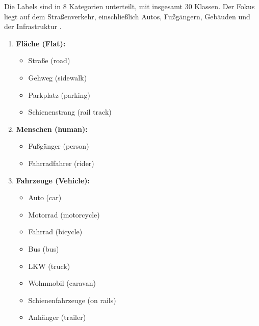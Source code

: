             Die Labels sind in $8$ Kategorien unterteilt, mit insgesamt $30$ Klassen. Der Fokus liegt auf dem Straßenverkehr, einschließlich Autos, Fußgängern, Gebäuden und der Infrastruktur \cite{cityscapes_overview, cityscapes_paper}. 
            \begin{enumerate}
            \item \textbf{Fläche (Flat):}
                \begin{itemize}
                    \item Straße (road)
                    \item Gehweg (sidewalk)
                    \item Parkplatz (parking)
                    \item Schienenstrang (rail track)
                \end{itemize}
                \item \textbf{Menschen (human):}
                    \begin{itemize}
                    \item Fußgänger (person)
                    \item Fahrradfahrer (rider)
                \end{itemize}
                \item \textbf{Fahrzeuge (Vehicle):}
                \begin{itemize}
                    \item Auto (car)
                    \item Motorrad (motorcycle)
                    \item Fahrrad (bicycle)
                    \item Bus (bus)
                    \item LKW (truck)
                    \item Wohnmobil (caravan)
                    \item Schienenfahrzeuge (on rails)
                    \item Anhänger (trailer)
                \end{itemize}


\end{enumerate}
